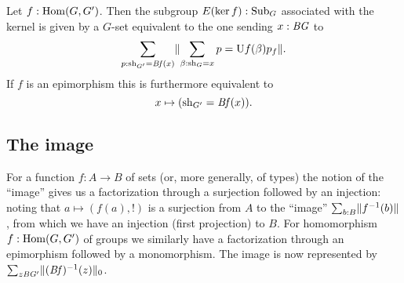 \begin{xca}
  Let $f:\Hom(G,G')$.  Then the subgroup $E(\ker f):\typesubgroup_G$ associated with the kernel is given by a $G$-set equivalent to the one sending $x:\mathit{B}\mathit{G}$ to
  $$\sum_{p:\mathrm{sh}_{G'}=\mathit{B}\mathit{f}(x)}\lVert\sum_{\beta:\mathrm{sh}_G=x}p=\mathrm{U} f(\beta)p_f\rVert.$$
  If $f$ is an epimorphism this is furthermore equivalent to
  $$x\mapsto(\mathrm{sh}_{G'}=\mathit{B}\mathit{f}(x)).$$
\end{xca}

\subsection{The image}
\label{sec:image}

For a function $f:A\to B$ of sets (or, more generally, of types) the notion of the ``image'' gives us a factorization through a surjection followed by an injection: noting that $a\mapsto (f(a),!)$ is a surjection from $A$ to the ``image'' $\sum_{b:B}\lVert f^{-1}(b)\rVert$, from which we have an injection (first projection) to $B$.
For homomorphism $f:\Hom(G,G')$ of groups we similarly have a factorization through an epimorphism followed by a monomorphism.  The image is now represented by %
$\sum_{z\mathit{B}\mathit{G}'}\lVert(\mathit{B}\mathit{f})^{-1}(z)\rVert_0$.

